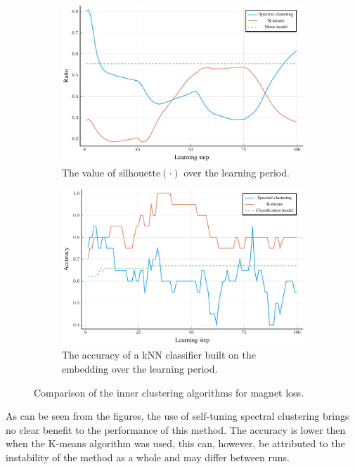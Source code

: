 \begin{figure}[h]
  \centering
  \begin{subfigure}[t]{0.49\textwidth}
    \centering
    \includegraphics[width=\textwidth]{images/magnet-spectral/ratio/magnet-spectral-ratio.pdf}
    \caption{The value of \( \mathrm{silhouette} \left( \cdot \right) \) over the learning period.}
  \end{subfigure}
  \hfill
  \begin{subfigure}[t]{0.49\textwidth}
    \centering
    \includegraphics[width=\textwidth]{images/magnet-spectral/accuracy/magnet-spectral-accuracy.pdf}
    \caption{The accuracy of a kNN classifier built on the embedding over the learning period.}
  \end{subfigure}
  \caption{Comparison of the inner clustering algorithms for magnet loss.}\label{fig:magnet-spectral}
\end{figure}

As can be seen from the figures, the use of self-tuning spectral clustering brings no clear benefit to the performance of this method. The accuracy is lower then when the K-means algorithm was used, this can, however, be attributed to the instability of the method as a whole and may differ between runs.
